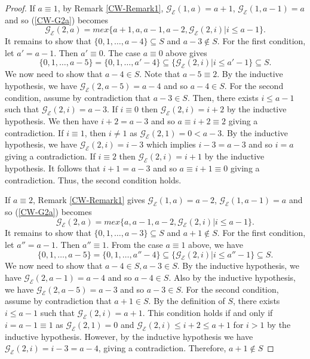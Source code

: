 \documentclass[12pt]{amsart}
\theoremstyle{plain}
\theoremstyle{definition}
\theoremstyle{remark}
\begin{document}
\begin{proof}
If $a \equiv  1$, by Remark \ref{CW-Remark1}, ${\mathcal{G}}_{\mathcal{E}}(1,a) = a+1$, ${\mathcal{G}}_{\mathcal{E}}(1,a-1)=a$ and so (\ref{CW-G2a}) becomes
\[{\mathcal{G}}_{\mathcal{E}}(2,a) = mex \{a+1,a,a-1,a-2, {\mathcal{G}}_{\mathcal{E}}(2,i) | i \leq a-1\}.\]
It remains to show that $\{0, 1, \ldots, a-4\} \subseteq S$ and $a-3 \notin S$. For the first condition, let $a' = a-1$. Then $a' \equiv  0$. The case $a \equiv  0$ above gives
\[\{0,1, \ldots, a-5\} = \{0,1, \ldots, a'-4\} \subseteq \{{\mathcal{G}}_{\mathcal{E}}(2,i) | i \leq a'-1\} \subseteq S.\]
We now need to show that $a-4 \in S$. Note that $a-5 \equiv  2$. By the inductive hypothesis, we have ${\mathcal{G}}_{\mathcal{E}}(2,a-5) = a-4$ and so $a-4 \in S$. For the second condition, assume by contradiction that $a-3 \in S$. Then, there exists $i \leq a-1$ such that ${\mathcal{G}}_{\mathcal{E}}(2,i) = a-3$. If $i \equiv  0$ then ${\mathcal{G}}_{\mathcal{E}}(2,i) = i+2$ by the inductive hypothesis. We then have $i+2 = a-3$ and so $a \equiv  i+2 \equiv  2$ giving a contradiction. If $i \equiv  1$, then $i \neq 1$ as ${\mathcal{G}}_{\mathcal{E}}(2,1) = 0 < a-3$. By the inductive hypothesis, we have ${\mathcal{G}}_{\mathcal{E}}(2,i) = i-3$ which implies $i-3 = a-3$ and so $i = a$ giving a contradiction. If $i \equiv  2$ then ${\mathcal{G}}_{\mathcal{E}}(2,i) = i+1$ by the inductive hypothesis. It follows that $i+1 = a-3$ and so $a \equiv  i+1 \equiv  0$ giving a contradiction. Thus, the second condition holds.

If $a \equiv  2$, Remark \ref{CW-Remark1} gives ${\mathcal{G}}_{\mathcal{E}}(1,a) = a-2$, ${\mathcal{G}}_{\mathcal{E}}(1,a-1)=a$ and so (\ref{CW-G2a}) becomes
\[{\mathcal{G}}_{\mathcal{E}}(2,a) = mex \{a,a-1,a-2, {\mathcal{G}}_{\mathcal{E}}(2,i) | i \leq a-1\}.\]
It remains to show that $\{0, 1, \ldots, a-3\} \subseteq S$ and $a+1 \notin S$. For the first condition, let $a'' = a-1$. Then $a'' \equiv  1$. From the case $a \equiv  1$ above, we have
\[\{0,1, \ldots, a-5\} = \{0,1, \ldots, a''-4\} \subseteq \{{\mathcal{G}}_{\mathcal{E}}(2,i) | i \leq a''-1\} \subseteq S.\]
We now need to show that $a-4 \in S, a-3 \in S$. By the inductive hypothesis, we have ${\mathcal{G}}_{\mathcal{E}}(2,a-1) = a-4$ and so $a-4 \in S$. Also by the inductive hypothesis, we have ${\mathcal{G}}_{\mathcal{E}}(2,a-5) = a-3$ and so $a-3 \in S$. For the second condition, assume by contradiction that $a+1 \in S$. By the definition of $S$, there exists $i \leq a-1$ such that ${\mathcal{G}}_{\mathcal{E}}(2,i) = a+1$. This condition holds if and only if $i = a-1 \equiv  1$ as ${\mathcal{G}}_{\mathcal{E}}(2,1) = 0$ and ${\mathcal{G}}_{\mathcal{E}}(2,i) \leq i+2 \leq a+1$ for $i > 1$ by the inductive hypothesis. However, by the inductive hypothesis we have  ${\mathcal{G}}_{\mathcal{E}}(2,i) = i-3 = a-4$, giving a contradiction. Therefore, $a+1 \notin S$
\end{proof}
\end{document}
